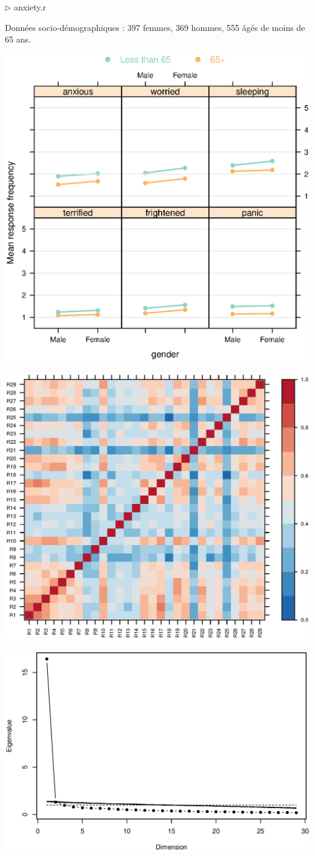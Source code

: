 \hfill $\triangleright$ anxiety.r

Données socio-démographiques : 397 femmes, 369 hommes, 555 âgés de moins de 65
ans.

{\centering \includegraphics[width=.4\textwidth]{figs/anxiety_respfreq_by_gender.eps}\par}



{\centering \includegraphics[width=.5\textwidth]{figs/anxiety_polychoric.eps}\par}



{\centering \includegraphics[width=.5\textwidth]{figs/anxiety_screeplot.eps}\par}

